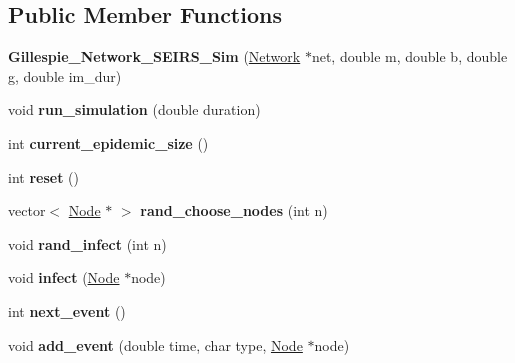 \subsection*{Public Member Functions}
\begin{DoxyCompactItemize}
\item 
\hypertarget{classGillespie__Network__SEIRS__Sim_af3ce0634c2db7ec0e52df194862d3c54}{}{\bfseries Gillespie\+\_\+\+Network\+\_\+\+S\+E\+I\+R\+S\+\_\+\+Sim} (\hyperlink{classNetwork}{Network} $\ast$net, double m, double b, double g, double im\+\_\+dur)\label{classGillespie__Network__SEIRS__Sim_af3ce0634c2db7ec0e52df194862d3c54}

\item 
\hypertarget{classGillespie__Network__SEIRS__Sim_ad40e3f247461baff81b5d4a09c50d1b5}{}void {\bfseries run\+\_\+simulation} (double duration)\label{classGillespie__Network__SEIRS__Sim_ad40e3f247461baff81b5d4a09c50d1b5}

\item 
\hypertarget{classGillespie__Network__SEIRS__Sim_a222828bfc04960db72c3e0c70d092c23}{}int {\bfseries current\+\_\+epidemic\+\_\+size} ()\label{classGillespie__Network__SEIRS__Sim_a222828bfc04960db72c3e0c70d092c23}

\item 
\hypertarget{classGillespie__Network__SEIRS__Sim_a61a0e4c7bdd2f4bbea0c8d243b451b0b}{}int {\bfseries reset} ()\label{classGillespie__Network__SEIRS__Sim_a61a0e4c7bdd2f4bbea0c8d243b451b0b}

\item 
\hypertarget{classGillespie__Network__SEIRS__Sim_a96af62a8a574e29b4f5984bbfbaa2887}{}vector$<$ \hyperlink{classNode}{Node} $\ast$ $>$ {\bfseries rand\+\_\+choose\+\_\+nodes} (int n)\label{classGillespie__Network__SEIRS__Sim_a96af62a8a574e29b4f5984bbfbaa2887}

\item 
\hypertarget{classGillespie__Network__SEIRS__Sim_a6aa0b3cd23a36e76c591d7395e428a92}{}void {\bfseries rand\+\_\+infect} (int n)\label{classGillespie__Network__SEIRS__Sim_a6aa0b3cd23a36e76c591d7395e428a92}

\item 
\hypertarget{classGillespie__Network__SEIRS__Sim_abae7c7a901f40ab3047a805fe7f91e4a}{}void {\bfseries infect} (\hyperlink{classNode}{Node} $\ast$node)\label{classGillespie__Network__SEIRS__Sim_abae7c7a901f40ab3047a805fe7f91e4a}

\item 
\hypertarget{classGillespie__Network__SEIRS__Sim_a3e1987e0ca831efafbc4cd7b470675f7}{}int {\bfseries next\+\_\+event} ()\label{classGillespie__Network__SEIRS__Sim_a3e1987e0ca831efafbc4cd7b470675f7}

\item 
\hypertarget{classGillespie__Network__SEIRS__Sim_a0b75c947ffb7646dfd43d7d2ee4dbad9}{}void {\bfseries add\+\_\+event} (double time, char type, \hyperlink{classNode}{Node} $\ast$node)\label{classGillespie__Network__SEIRS__Sim_a0b75c947ffb7646dfd43d7d2ee4dbad9}

\end{DoxyCompactItemize}
